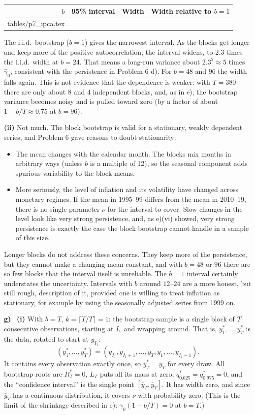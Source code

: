 \documentclass[11pt]{article}
\makeatletter
\newcommand{\itm}[1]{\par\textbf{#1)}\ }
\newcommand{\tablerows}[1]{\@@input #1 }
\makeatother
\begin{document}
\begin{table}[H]
	\centering
	\begin{tabular}{rccc}
		\toprule
		$b$ & 95\% interval & Width & Width relative to $b=1$ \\
		\midrule
		\tablerows{tables/p7_ipca.tex}
		\bottomrule
	\end{tabular}
\end{table}

The i.i.d.\ bootstrap ($b=1$) gives the narrowest interval. As the blocks get longer and keep more of the positive autocorrelation, the interval widens, to $2.3$ times the i.i.d.\ width at $b=24$. That means a long-run variance about $2.3^2\approx5$ times $\hat\gamma_0$, consistent with the persistence in Problem 6 d). For $b=48$ and $96$ the width falls again. This is not evidence that the dependence is weaker: with $T=380$ there are only about $8$ and $4$ independent blocks, and, as in e), the bootstrap variance becomes noisy and is pulled toward zero (by a factor of about $1-b/T\approx0.75$ at $b=96$).

\textbf{(ii)} Not much. The block bootstrap is valid for a stationary, weakly dependent series, and Problem 6 gave reasons to doubt stationarity:
\begin{itemize}
	\item The mean changes with the calendar month. The blocks mix months in arbitrary ways (unless $b$ is a multiple of 12), so the seasonal component adds spurious variability to the block means.
	\item More seriously, the level of inflation and its volatility have changed across monetary regimes. If the mean in 1995--99 differs from the mean in 2010--19, there is no single parameter $\nu$ for the interval to cover. Slow changes in the level look like very strong persistence, and, as e)(vi) showed, very strong persistence is exactly the case the block bootstrap cannot handle in a sample of this size.
\end{itemize}
Longer blocks do not address these concerns. They keep more of the persistence, but they cannot make a changing mean constant, and with $b=48$ or $96$ there are so few blocks that the interval itself is unreliable. The $b=1$ interval certainly understates the uncertainty. Intervals with $b$ around $12$--$24$ are a more honest, but still rough, description of it, provided one is willing to treat inflation as stationary, for example by using the seasonally adjusted series from 1999 on.

\itm{g}
\textbf{(i)} With $b=T$, $k=\lceil T/T\rceil=1$: the bootstrap sample is a single block of $T$ consecutive observations, starting at $I_1$ and wrapping around. That is, $y^*_1,\dots,y^*_T$ is the data, rotated to start at $y_{I_1}$:
\[
(y^*_1,\dots,y^*_T) = (y_{I_1},y_{I_1+1},\dots,y_T,y_1,\dots,y_{I_1-1}).
\]
It contains every observation exactly once, so $\bar y^*_T=\bar y_T$ for every draw. All bootstrap roots are $R^*_T=0$, $L_T$ puts all its mass at zero, $q^*_{0.025}=q^*_{0.975}=0$, and the ``confidence interval'' is the single point $[\bar y_T,\bar y_T]$. It has width zero, and since $\bar y_T$ has a continuous distribution, it covers $\nu$ with probability zero. (This is the limit of the shrinkage described in e): $\gamma_0(1-b/T)=0$ at $b=T$.)
\end{document}
